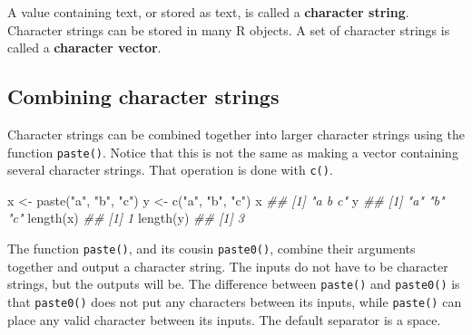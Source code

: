 \documentclass[
  13,
  letterpaper,
]{report}
\newenvironment{Shaded}{\begin{snugshade}}{\end{snugshade}}
\newcommand{\DocumentationTok}[1]{\textcolor[rgb]{0.37,0.37,0.37}{\textit{#1}}}
\newcommand{\FunctionTok}[1]{\textcolor[rgb]{0.28,0.35,0.67}{#1}}
\newcommand{\NormalTok}[1]{\textcolor[rgb]{0.00,0.23,0.31}{#1}}
\newcommand{\OtherTok}[1]{\textcolor[rgb]{0.00,0.23,0.31}{#1}}
\newcommand{\StringTok}[1]{\textcolor[rgb]{0.13,0.47,0.30}{#1}}
\begin{document}
A value containing text, or stored as text, is called a
\textbf{character string}. Character strings can be stored in many R
objects. A set of character strings is called a \textbf{character
vector}.

\subsection{Combining character strings}\label{sec-05-char-comb}

Character strings can be combined together into larger character strings
using the function \texttt{paste()}. Notice that this is not the same as
making a vector containing several character strings. That operation is
done with \texttt{c()}.

\begin{Shaded}
\begin{Highlighting}[]

\NormalTok{x }\OtherTok{\textless{}{-}} \FunctionTok{paste}\NormalTok{(}\StringTok{"a"}\NormalTok{, }\StringTok{"b"}\NormalTok{, }\StringTok{"c"}\NormalTok{)}
\NormalTok{y }\OtherTok{\textless{}{-}} \FunctionTok{c}\NormalTok{(}\StringTok{"a"}\NormalTok{, }\StringTok{"b"}\NormalTok{, }\StringTok{"c"}\NormalTok{)}
\NormalTok{x}
\DocumentationTok{\#\# [1] "a b c"}
\NormalTok{y}
\DocumentationTok{\#\# [1] "a" "b" "c"}
\FunctionTok{length}\NormalTok{(x)}
\DocumentationTok{\#\# [1] 1}
\FunctionTok{length}\NormalTok{(y)}
\DocumentationTok{\#\# [1] 3}
\end{Highlighting}
\end{Shaded}

The function \texttt{paste()}, and its cousin \texttt{paste0()}, combine
their arguments together and output a character string. The inputs do
not have to be character strings, but the outputs will be. The
difference between \texttt{paste()} and \texttt{paste0()} is that
\texttt{paste0()} does not put any characters between its inputs, while
\texttt{paste()} can place any valid character between its inputs. The
default separator is a space.
\end{document}
